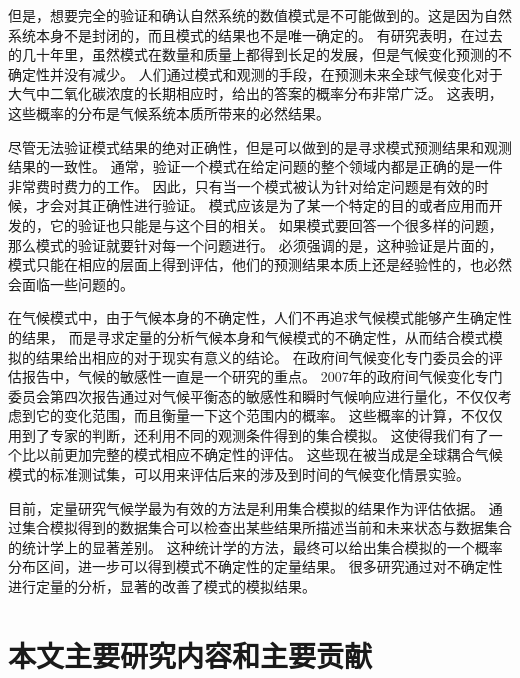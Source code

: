 但是，想要完全的验证和确认自然系统的数值模式是不可能做到的。这是因为自然系统本身不是封闭的，而且模式的结果也不是唯一确定的\cite{oreskes1994verification}。
有研究表明，在过去的几十年里，虽然模式在数量和质量上都得到长足的发展，但是气候变化预测的不确定性并没有减少。 
人们通过模式和观测的手段，在预测未来全球气候变化对于大气中二氧化碳浓度的长期相应时，给出的答案的概率分布非常广泛。
这表明，这些概率的分布是气候系统本质所带来的必然结果\cite{roe2007climate}。 

尽管无法验证模式结果的绝对正确性，但是可以做到的是寻求模式预测结果和观测结果的一致性。
通常，验证一个模式在给定问题的整个领域内都是正确的是一件非常费时费力的工作。 
因此，只有当一个模式被认为针对给定问题是有效的时候，才会对其正确性进行验证。 
模式应该是为了某一个特定的目的或者应用而开发的，它的验证也只能是与这个目的相关\cite{sargent2005verification}。
如果模式要回答一个很多样的问题，那么模式的验证就要针对每一个问题进行。
必须强调的是，这种验证是片面的，模式只能在相应的层面上得到评估，他们的预测结果本质上还是经验性的，也必然会面临一些问题的。


在气候模式中，由于气候本身的不确定性，人们不再追求气候模式能够产生确定性的结果，
而是寻求定量的分析气候本身和气候模式的不确定性，从而结合模式模拟的结果给出相应的对于现实有意义的结论。
在政府间气候变化专门委员会的评估报告中，气候的敏感性一直是一个研究的重点。
2007年的政府间气候变化专门委员会第四次报告通过对气候平衡态的敏感性和瞬时气候响应进行量化，不仅仅考虑到它的变化范围，而且衡量一下这个范围内的概率。
这些概率的计算，不仅仅用到了专家的判断，还利用不同的观测条件得到的集合模拟。 
这使得我们有了一个比以前更加完整的模式相应不确定性的评估。 
这些现在被当成是全球耦合气候模式的标准测试集，可以用来评估后来的涉及到时间的气候变化情景实验\cite{meehl2007global}。 
 
目前，定量研究气候学最为有效的方法是利用集合模拟的结果作为评估依据\cite{von2013testing,reynolds1994random, allen2002towards}。
通过集合模拟得到的数据集合可以检查出某些结果所描述当前和未来状态与数据集合的统计学上的显著差别。
这种统计学的方法，最终可以给出集合模拟的一个概率分布区间，进一步可以得到模式不确定性的定量结果。
很多研究通过对不确定性进行定量的分析，显著的改善了模式的模拟结果\cite{reynolds1994random}。


\section{本文主要研究内容和主要贡献}
